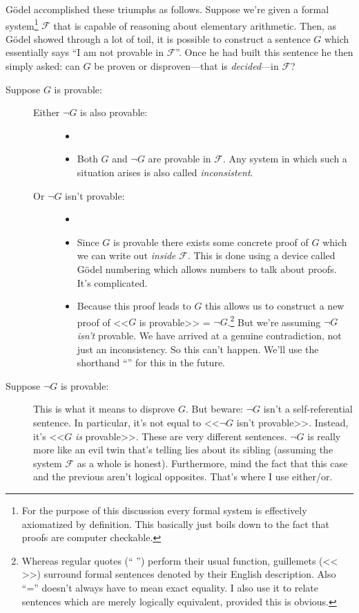 \documentclass{article}
\theoremstyle{customstyle}
\newcommand{\F}{\ensuremath{\mathcal{F}}}
\begin{document}
Gödel accomplished these triumphs as follows. Suppose we're given a formal system\footnote{For the purpose of this discussion every formal system is effectively axiomatized by definition. This basically just boils down to the fact that proofs are computer checkable.} $\F$ that is capable of reasoning about elementary arithmetic. Then, as Gödel showed through a lot of toil, it is possible to construct a sentence $G$ which essentially says ``I am not provable in $\F$''. Once he had built this sentence he then simply asked: can $G$ be proven or disproven---that is \textit{decided}---in $\F$?

\begin{description}
\item[Suppose $G$ is provable:]
\begin{description}
\item[]
\item[Either $\neg G$ is also provable:]
\begin{itemize}
\item[]
\item Both $G$ and $\neg G$ are provable in $\F$. Any system in which such a situation arises is also called \textit{inconsistent}.
\end{itemize}
\item[Or $\neg G$ isn't provable:]
\begin{itemize}
\item[]
\item Since $G$ is provable there exists some concrete proof of $G$ which we can write out \textit{inside} $\F$. This is done using a device called Gödel numbering which allows numbers to talk about proofs. It's complicated.
\item Because this proof leads to $G$ this allows us to construct a new proof of <<$G$ is provable>> = $\neg G$.\footnote{Whereas regular quotes (`` '') perform their usual function, guillemets (<< >>) surround formal sentences denoted by their English description. Also ``='' doesn't always have to mean exact equality. I also use it to relate sentences which are merely logically equivalent, provided this is obvious.} But we're assuming $\neg G$ \textit{isn't} provable. We have arrived at a genuine contradiction, not just an inconsistency. So this can't happen. We'll use the shorthand ``\lightning'' for this in the future.
\end{itemize}
\end{description}
\item[Suppose $\neg G$ is provable:]
This is what it means to disprove $G$. But beware: $\neg G$ isn't a self-referential sentence. In particular, it's not equal to <<$\neg G$ isn't provable>>. Instead, it's <<$G$ \textit{is} provable>>. These are very different sentences. $\neg G$ is really more like an evil twin that's telling lies about its sibling (assuming the system $\F$  as a whole is honest). Furthermore, mind the fact that this case and the previous aren't logical opposites. That's where I use either/or.

\end{description}
\end{document}
